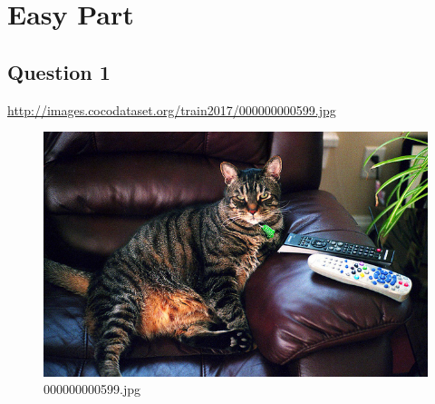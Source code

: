 \section{Easy Part}
\subsection*{Question 1} 
\url{http://images.cocodataset.org/train2017/000000000599.jpg}
    \begin{figure}[h]
        \centering
        \includegraphics[width=0.8\linewidth]{../image set/easy/000000000599.jpg}
        \caption{000000000599.jpg}
    \end{figure}
